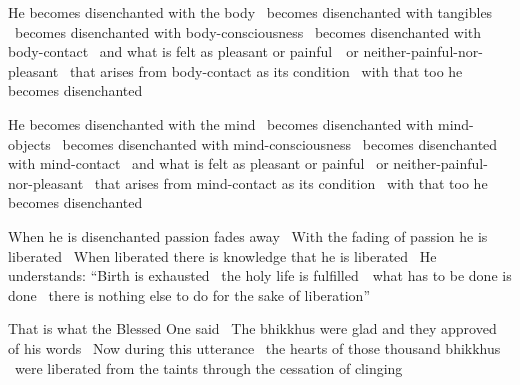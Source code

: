 \begin{english-only-hang}
  He becomes disenchanted with the body \breathmark\ becomes disenchanted with tangibles \breathmark\ becomes disenchanted with body-consciousness \breathmark\ becomes disenchanted with body-contact \breathmark\ and what is felt as pleasant or \mbox{painful}~\breathmark\ or neither-painful-nor-pleasant \breathmark\ that arises from body-contact as its condition \breathmark\ with that too he becomes disenchanted
\end{english-only-hang}

\begin{english-only-hang}
  He becomes disenchanted with the mind \breathmark\ becomes disenchanted with mind-objects \breathmark\ becomes disenchanted with mind-consciousness \breathmark\ becomes disenchanted with mind-contact \breathmark\ and what is felt as pleasant or painful \breathmark\ or neither-painful-nor-pleasant \breathmark\ that arises from mind-contact as its condition \breathmark\ with that too he becomes disenchanted
\end{english-only-hang}

\begin{english-only-hang}
  When he is disenchanted passion fades away \breathmark\ With the fading of passion he is liberated \breathmark\ When liberated there is knowledge that he is liberated \breathmark\ He understands: ``Birth is exhausted \breathmark\ the holy life is \mbox{fulfilled}~\breathmark\ what has to be done is done \breathmark\ there is nothing else to do for the sake of liberation''
\end{english-only-hang}

\begin{english-only-hang}
  That is what the Blessed One said \breathmark\ The bhikkhus were glad and they approved of his words \breathmark\ Now during this utterance \breathmark\ the hearts of those thousand bhikkhus \breathmark\ were liberated from the taints through the cessation of clinging
\end{english-only-hang}

\suttaRef{[SN 35.28]}

\ifdigital{}\fi

\endgroup

